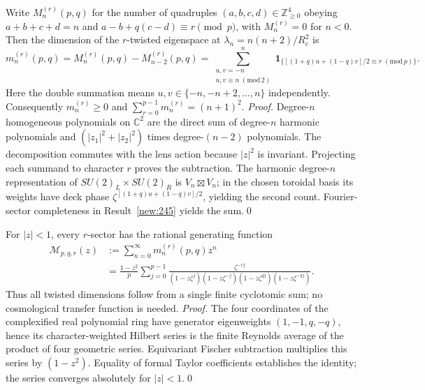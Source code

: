 \begin{result}\label{new:246}
Write $M_n^{(r)}(p,q)$ for the number of quadruples $(a,b,c,d)\in\mathbb Z_{\ge0}^4$ obeying $a+b+c+d=n$ and $a-b+q(c-d)\equiv r\pmod p$, with $M_n^{(r)}=0$ for $n<0$. Then the dimension of the $r$-twisted eigenspace at $\lambda_n=n(n+2)/R_c^2$ is
\begin{equation}\label{eq:twisted246}
 m_n^{(r)}(p,q)=M_n^{(r)}(p,q)-M_{n-2}^{(r)}(p,q)
 =\sum_{\substack{u,v=-n\\u,v\equiv n\;(\mathrm{mod}\,2)}}^n
 \mathbf1_{\{[(1+q)u+(1-q)v]/2\equiv r\;(\mathrm{mod}\,p)\}}.
\end{equation}
Here the double summation means $u,v\in\{-n,-n+2,\dots,n\}$ independently. Consequently $m_n^{(r)}\ge0$ and $\sum_{r=0}^{p-1}m_n^{(r)}=(n+1)^2$.
\textit{Proof.} Degree-$n$ homogeneous polynomials on $\mathbb C^2$ are the direct sum of degree-$n$ harmonic polynomials and $(|z_1|^2+|z_2|^2)$ times degree-$(n-2)$ polynomials. The decomposition commutes with the lens action because $|z|^2$ is invariant. Projecting each summand to character $r$ proves the subtraction. The harmonic degree-$n$ representation of $SU(2)_L\times SU(2)_R$ is $V_n\boxtimes V_n$; in the chosen toroidal basis its weights have deck phase $\zeta^{[(1+q)u+(1-q)v]/2}$, yielding the second count. Fourier-sector completeness in Result~\ref{new:245} yields the sum.\qed
\end{result}

\begin{result}\label{new:247}
For $|z|<1$, every $r$-sector has the rational generating function
\begin{align}\label{eq:twisted247}
 \mathcal M_{p,q,r}(z)&:=\sum_{n=0}^{\infty}m_n^{(r)}(p,q)z^n \\
 &=\frac{1-z^2}{p}\sum_{j=0}^{p-1}
 \frac{\zeta^{-rj}}{(1-z\zeta^j)(1-z\zeta^{-j})(1-z\zeta^{qj})(1-z\zeta^{-qj})}.
\end{align}
Thus all twisted dimensions follow from a single finite cyclotomic sum; no cosmological transfer function is needed.
\textit{Proof.} The four coordinates of the complexified real polynomial ring have generator eigenweights $(1,-1,q,-q)$, hence its character-weighted Hilbert series is the finite Reynolds average of the product of four geometric series. Equivariant Fischer subtraction multiplies this series by $(1-z^2)$. Equality of formal Taylor coefficients establishes the identity; the series converges absolutely for $|z|<1$.\qed
\end{result}

